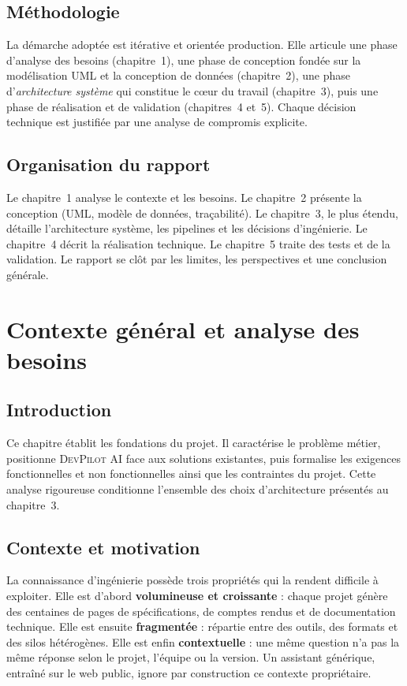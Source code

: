 \documentclass[12pt,a4paper,oneside]{report}
\newcommand{\devpilot}{\textsc{DevPilot AI}}
\begin{document}
\section*{Méthodologie}
La démarche adoptée est itérative et orientée production. Elle articule une phase
d'analyse des besoins (chapitre~1), une phase de conception fondée sur la
modélisation UML et la conception de données (chapitre~2), une phase
d'\emph{architecture système} qui constitue le c{\oe}ur du travail
(chapitre~3), puis une phase de réalisation et de validation (chapitres~4 et~5).
Chaque décision technique est justifiée par une analyse de compromis explicite.

\section*{Organisation du rapport}
Le chapitre~1 analyse le contexte et les besoins. Le chapitre~2 présente la
conception (UML, modèle de données, traçabilité). Le chapitre~3, le plus étendu,
détaille l'architecture système, les pipelines et les décisions d'ingénierie. Le
chapitre~4 décrit la réalisation technique. Le chapitre~5 traite des tests et de
la validation. Le rapport se clôt par les limites, les perspectives et une
conclusion générale.

\chapter{Contexte général et analyse des besoins}
\label{chap:contexte}

\section{Introduction}
Ce chapitre établit les fondations du projet. Il caractérise le problème métier,
positionne \devpilot{} face aux solutions existantes, puis formalise les exigences
fonctionnelles et non fonctionnelles ainsi que les contraintes du projet. Cette
analyse rigoureuse conditionne l'ensemble des choix d'architecture présentés au
chapitre~3.

\section{Contexte et motivation}
La connaissance d'ingénierie possède trois propriétés qui la rendent difficile à
exploiter. Elle est d'abord \textbf{volumineuse et croissante} : chaque projet
génère des centaines de pages de spécifications, de comptes rendus et de
documentation technique. Elle est ensuite \textbf{fragmentée} : répartie entre
des outils, des formats et des silos hétérogènes. Elle est enfin
\textbf{contextuelle} : une même question n'a pas la même réponse selon le projet,
l'équipe ou la version. Un assistant générique, entraîné sur le web public,
ignore par construction ce contexte propriétaire.
\end{document}
